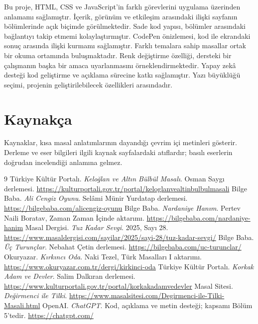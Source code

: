 \documentclass[12pt,a4paper]{article}
\begin{document}
Bu proje, HTML, CSS ve JavaScript'in farklı görevlerini uygulama üzerinden anlamamı sağlamıştır. İçerik, görünüm ve etkileşim arasındaki ilişki sayfanın bölümlerinde açık biçimde görülmektedir. Sade kod yapısı, bölümler arasındaki bağlantıyı takip etmemi kolaylaştırmıştır. CodePen önizlemesi, kod ile ekrandaki sonuç arasında ilişki kurmamı sağlamıştır. Farklı temalara sahip masallar ortak bir okuma ortamında buluşmaktadır. Renk değiştirme özelliği, dersteki bir çalışmanın başka bir amaca uyarlanmasını örneklendirmektedir. Yapay zekâ desteği kod geliştirme ve açıklama sürecine katkı sağlamıştır. Yazı büyüklüğü seçimi, projenin geliştirilebilecek özellikleri arasındadır.

\section{Kaynakça}
Kaynaklar, kısa masal anlatımlarının dayandığı çevrim içi metinleri gösterir. Derleme ve eser bilgileri ilgili kaynak sayfalardaki atıflardır; basılı eserlerin doğrudan incelendiği anlamına gelmez.



\begin{thebibliography}{9}
 Türkiye Kültür Portalı. \emph{Keloğlan ve Altın Bülbül Masalı}. Osman Saygı derlemesi. \url{https://kulturportali.gov.tr/portal/keloglanvealtinbulbulmasali}
 Bilge Baba. \emph{Ali Cengiz Oyunu}. Selâmi Münir Yurdatap derlemesi. \url{https://bilgebaba.com/alicengiz-oyunu}
 Bilge Baba. \emph{Nardaniye Hanım}. Pertev Naili Boratav, Zaman Zaman İçinde aktarımı. \url{https://bilgebaba.com/nardaniye-hanim}
 Masal Dergisi. \emph{Tuz Kadar Sevgi}. 2025, Sayı 28. \url{https://www.masaldergisi.com/sayilar/2025/sayi-28/tuz-kadar-sevgi/}
 Bilge Baba. \emph{Üç Turunçlar}. Nebahat Çetin derlemesi. \url{https://bilgebaba.com/uc-turunclar/}
 Okuryazar. \emph{Kırkıncı Oda}. Naki Tezel, Türk Masalları I aktarımı. \url{https://www.okuryazar.com.tr/dergi/kirkinci-oda}
 Türkiye Kültür Portalı. \emph{Korkak Adam ve Devler}. Salim Dalkıran derlemesi. \url{https://www.kulturportali.gov.tr/portal/korkakadamvedevler}
 Masal Sitesi. \emph{Değirmenci ile Tilki}.  \url{https://www.masalsitesi.com/Degirmenci-ile-Tilki-Masali.html}
 OpenAI. \emph{ChatGPT}. Kod, açıklama ve metin desteği; kapsamı Bölüm 5'tedir. \url{https://chatgpt.com/}
\end{thebibliography}
\end{document}
